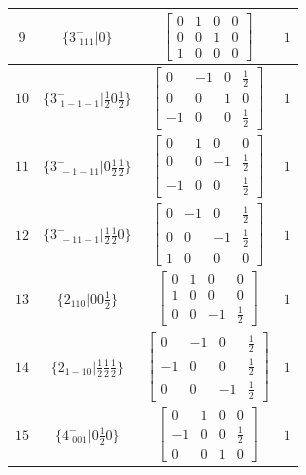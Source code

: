 \documentclass[fleqn,8pt]{jsarticle}
\begin{document}
\begin{longtable}{cccc}
$ 9 $ & $ \{3^{-}_{\,\,111}|0\} $ & $ \begin{bmatrix} 0 & 1 & 0 & 0 \\ 0 & 0 & 1 & 0 \\ 1 & 0 & 0 & 0 \end{bmatrix} $ & $ 1 $ \\ \hline
$ 10 $ & $ \{3^{-}_{\,\,1-1-1}|\frac{1}{2} 0 \frac{1}{2}\} $ & $ \begin{bmatrix} 0 & -1 & 0 & \frac{1}{2} \\ 0 & 0 & 1 & 0 \\ -1 & 0 & 0 & \frac{1}{2} \end{bmatrix} $ & $ 1 $ \\ \hline
$ 11 $ & $ \{3^{-}_{\,\,-1-11}|0 \frac{1}{2} \frac{1}{2}\} $ & $ \begin{bmatrix} 0 & 1 & 0 & 0 \\ 0 & 0 & -1 & \frac{1}{2} \\ -1 & 0 & 0 & \frac{1}{2} \end{bmatrix} $ & $ 1 $ \\ \hline
$ 12 $ & $ \{3^{-}_{\,\,-11-1}|\frac{1}{2} \frac{1}{2} 0\} $ & $ \begin{bmatrix} 0 & -1 & 0 & \frac{1}{2} \\ 0 & 0 & -1 & \frac{1}{2} \\ 1 & 0 & 0 & 0 \end{bmatrix} $ & $ 1 $ \\ \hline
$ 13 $ & $ \{2{}_{110}|0 0 \frac{1}{2}\} $ & $ \begin{bmatrix} 0 & 1 & 0 & 0 \\ 1 & 0 & 0 & 0 \\ 0 & 0 & -1 & \frac{1}{2} \end{bmatrix} $ & $ 1 $ \\ \hline
$ 14 $ & $ \{2{}_{1-10}|\frac{1}{2} \frac{1}{2} \frac{1}{2}\} $ & $ \begin{bmatrix} 0 & -1 & 0 & \frac{1}{2} \\ -1 & 0 & 0 & \frac{1}{2} \\ 0 & 0 & -1 & \frac{1}{2} \end{bmatrix} $ & $ 1 $ \\ \hline
$ 15 $ & $ \{4^{-}_{\,\,001}|0 \frac{1}{2} 0\} $ & $ \begin{bmatrix} 0 & 1 & 0 & 0 \\ -1 & 0 & 0 & \frac{1}{2} \\ 0 & 0 & 1 & 0 \end{bmatrix} $ & $ 1 $ \\ \hline

\end{longtable}
\end{document}
